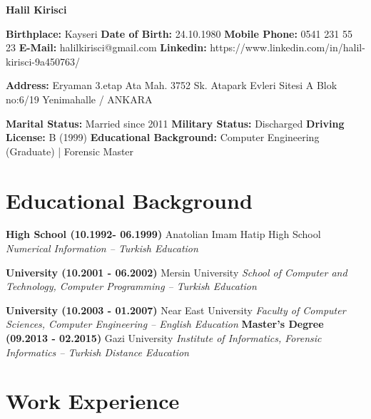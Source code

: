 \documentclass{article}
\begin{document}
\noindent\textbf{Halil Kirisci}

\noindent \textbf{Birthplace:} Kayseri
\newline \textbf{Date of Birth:} 24.10.1980
\newline \textbf{Mobile Phone:} 0541 231 55 23
\newline \textbf{E-Mail:} halilkirisci@gmail.com
\newline \textbf{Linkedin:} https://www.linkedin.com/in/halil-kirisci-9a450763/



\noindent \textbf{Address: }
Eryaman 3.etap Ata Mah. 3752 Sk.
\newline Atapark Evleri Sitesi A Blok no:6/19
\newline Yenimahalle / ANKARA

\noindent \textbf{Marital Status:} Married since  2011
\newline \textbf{Military Status:} Discharged
\newline \textbf{Driving License:} B (1999)
\newline \textbf{Educational Background:} Computer Engineering (Graduate) | Forensic Master

\section*{Educational Background}

\noindent \textbf{High School (10.1992- 06.1999)}
\newline Anatolian Imam Hatip High School
\newline \textit{Numerical Information -- Turkish Education}

\noindent \textbf{University (10.2001 - 06.2002)}
\newline Mersin University
\newline \textit{School of Computer and Technology, Computer Programming -- Turkish Education}

\noindent \textbf{University (10.2003 - 01.2007)}
\newline Near East University
\newline \textit{Faculty of Computer Sciences, Computer Engineering -- English Education
}
\noindent \textbf{Master's Degree (09.2013 - 02.2015)}
\newline Gazi University
\newline \textit{Institute of Informatics, Forensic Informatics -- Turkish Distance Education}

\section*{Work Experience}
\end{document}
